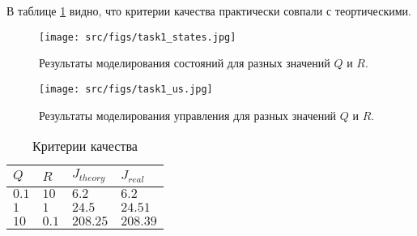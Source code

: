 В таблице \ref{table:task1} видно, что критерии качества практически совпали с теортическими.
\begin{figure}[ht!]
        \centering
        \texttt{[image: src/figs/task1\_states.jpg]}
        \caption{Результаты моделирования состояний для разных значений \(Q\) и \(R\).}
        \label{fig:task1_states}
\end{figure}

\begin{figure}[ht!]
        \centering
        \texttt{[image: src/figs/task1\_us.jpg]}
        \caption{Результаты моделирования управления для разных значений \(Q\) и \(R\).}
        \label{fig:task1_us}
\end{figure}

\begin{table}[h!]
        \centering
        \begin{tabular}{| l | l | l | l |} 
            \hline
            $Q$ & $R$ & $J_{theory}$ & $J_{real}$  \\  
            \hline
            $0.1$ & $10$ & $6.2$ & $6.2$  \\  
            $1$ & $1$ & $24.5$ & $24.51$  \\  
            $10$ & $0.1$ & $208.25$ & $208.39$  \\  
        \end{tabular}
        \caption{Критерии качества}
        \label{table:task1}
    \end{table}

\FloatBarrier